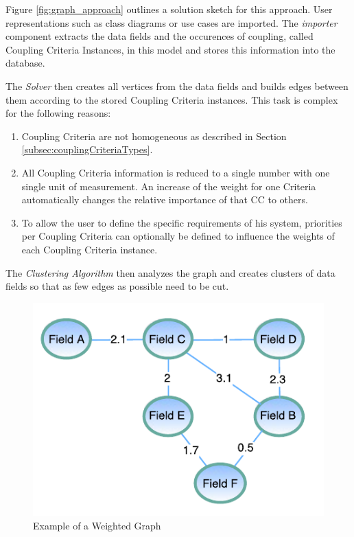 \begin{minipage}[t]{0.5\textwidth}
\setlength{\parskip}{5pt plus 0.1pt}
	Figure \ref{fig:graph_approach} outlines a solution sketch for this approach. User representations such as class diagrams or use cases are imported. The \textit{importer} component extracts the data fields and the occurences of coupling, called Coupling Criteria Instances, in this model and stores this information into the database.
	
	The \textit{Solver} then creates all vertices from the data fields and builds edges between them according to the stored Coupling Criteria instances. This task is complex for the following reasons:
	
	\begin{enumerate}
		\item Coupling Criteria are not homogeneous as described in Section \ref{subsec:couplingCriteriaTypes}. 
		
		\item All Coupling Criteria information is reduced to a single number with one single unit of measurement. An increase of the weight for one Criteria automatically changes the relative importance of that CC to others.
		
		\item To allow the user to define the specific requirements of his system, priorities per Coupling Criteria can optionally be defined to influence the weights of each Coupling Criteria instance.
	\end{enumerate}
	
	The \textit{Clustering Algorithm} then analyzes the graph and creates clusters of data fields so that as few edges as possible need to be cut.
	
	\begin{figure}[H]
		\includegraphics[scale=1.0]{diagrams/weighted_graph.pdf}
		\caption{Example of a Weighted Graph}
		\label{fig:weighted_graph}
	\end{figure}

\end{minipage}
